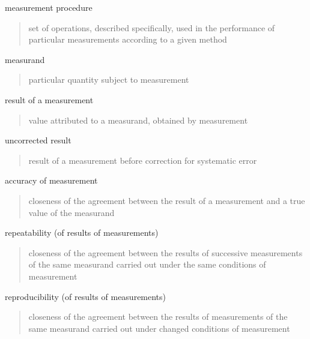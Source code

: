\documentclass[avery5371,grid]{flashcards}
\begin{document}
\begin{flashcard}[Defintion]{measurement procedure}
\hfill\vfill
\begin{quote}
    set of operations, described specifically, used in the performance of particular measurements according to a given method
\end{quote}
\vfill
\end{flashcard}

\begin{flashcard}[Defintion]{measurand}
\hfill\vfill
\begin{quote}
    particular quantity subject to measurement
\end{quote}
\vfill
\end{flashcard}

\begin{flashcard}[Defintion]{result of a measurement}
\hfill\vfill
\begin{quote}
    value attributed to a measurand, obtained by measurement
\end{quote}
\vfill
\end{flashcard}

\begin{flashcard}[Defintion]{uncorrected result}
\hfill\vfill
\begin{quote}
    result of a measurement before correction for systematic error
\end{quote}
\vfill
\end{flashcard}

\begin{flashcard}[Defintion]{accuracy of measurement}
\hfill\vfill
\begin{quote}
    closeness of the agreement between the result of a measurement and a true value of the measurand
\end{quote}
\vfill
\end{flashcard}

\begin{flashcard}[Defintion]{repeatability (of results of measurements)}
\hfill\vfill
\begin{quote}
    closeness of the agreement between the results of successive measurements of the same measurand carried out under the same conditions of measurement
\end{quote}
\vfill
\end{flashcard}

\begin{flashcard}[Defintion]{reproducibility (of results of measurements)}
\hfill\vfill
\begin{quote}
    closeness of the agreement between the results of measurements of the same measurand carried out under changed conditions of measurement
\end{quote}
\vfill
\end{flashcard}
\end{document}
